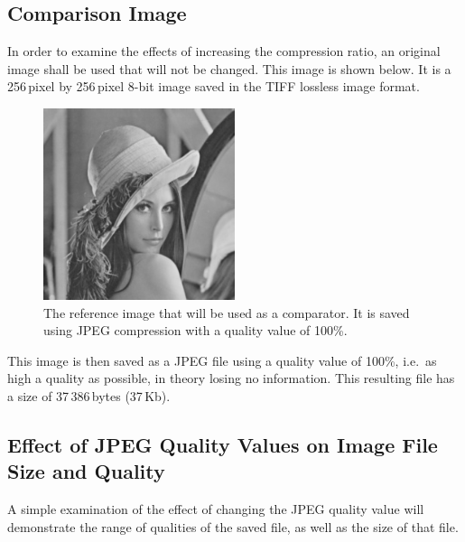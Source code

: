 \subsection{Comparison Image} %
\label{sub:comparison_image}
In order to examine the effects of increasing the compression ratio, an original image shall be used that will not be changed. This image is shown below. It is a 256\,pixel by 256\,pixel 8-bit image saved in the TIFF lossless image format.
\begin{figure}[ht]
 	\centering
 	\includegraphics[width=0.5\textwidth]{lena.jpg}
	\caption{The reference image that will be used as a comparator. It is saved using JPEG compression with a quality value of 100\%.\label{fig:orig}}
\end{figure}
This image is then saved as a JPEG file using a quality value of 100\%, i.e.\ as high a quality as possible, in theory losing no information. This resulting file has a size of 37\,386\,bytes (37\,Kb). 

\subsection{Effect of JPEG Quality Values on Image File Size and Quality} %
\label{sub:effect_of_jpeg_quality_values_on_image_file_size_and_quality}
A simple examination of the effect of changing the JPEG quality value will demonstrate the range of qualities of the saved file, as well as the size of that file.

